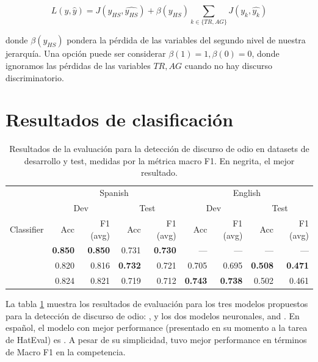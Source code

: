 \begin{equation}
    L(y, \widehat{y}) =  J(y_{HS}, \widehat{y_{HS}}) + \beta(y_{HS})\sum\limits_{k \in \{TR, AG\}} J(y_k, \widehat{y_k})
\end{equation}

donde $\beta(y_{HS})$ pondera la pérdida de las variables del segundo nivel de nuestra jerarquía. Una opción puede ser considerar $\beta(1) = 1, \beta(0) = 0$, donde ignoramos las pérdidas de las variables $TR, AG$ cuando no hay discurso discriminatorio.





\section{Resultados de clasificación}

\begin{table}[t]
    \centering
    \footnotesize
    \begin{tabular}{l  r  r  r  r | r  r  r  r }
         & \multicolumn{4}{c}{Spanish} & \multicolumn{4}{c}{English} \\
         &  \multicolumn{2}{c}{Dev}& \multicolumn{2}{c}{Test} &  \multicolumn{2}{c}{Dev}& \multicolumn{2}{c}{Test} \\
        Classifier & Acc & F1 (avg) & Acc & F1 (avg) & Acc & F1 (avg) & Acc & F1 (avg)\\
        \hline
        \svmmodel{}          & \textbf{0.850} & \textbf{0.850} & 0.731           & \textbf{0.730} & ---            & ---             & ---            & ---           \\
        \elmomodel{}         & 0.820          & 0.816          & \textbf{0.732}  & 0.721          & 0.705          & 0.695           & \textbf{0.508} & \textbf{0.471}\\
        \elmobowmodel{}      & 0.824          & 0.821          & 0.719           & 0.712          & \textbf{0.743} & \textbf{0.738}  & 0.502          & 0.461         \\
        \hline
    \end{tabular}
    \caption{Resultados de la evaluación para la detección de discurso de odio en datasets de desarrollo y test, medidas por la métrica macro F1. En negrita, el mejor resultado.}
    \label{tab:hateval_task_a}
\end{table}



La tabla \ref{tab:hateval_task_a} muestra los resultados de evaluación para los tres modelos propuestos para la detección de discurso de odio:  \svmmodel{}, y los dos modelos neuronales, \elmomodel{} and \elmobowmodel{}. En español, el modelo con mejor performance (presentado en su momento a la tarea de HatEval\citet{hateval2019semeval}) es \svmmodel{}.
A pesar de su simplicidad, tuvo mejor performance en términos de Macro F1 en la competencia.



